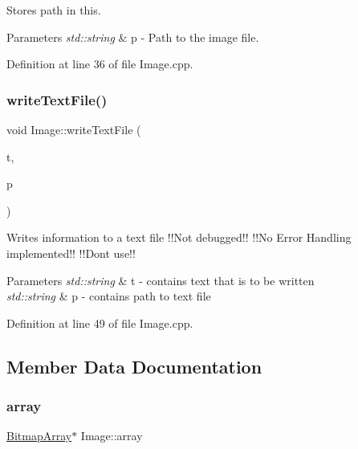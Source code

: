 Stores path in this. 


\begin{DoxyParams}{Parameters}
{\em std\+::string} & p -\/ Path to the image file. \\
\hline
\end{DoxyParams}


Definition at line 36 of file Image.\+cpp.

\mbox{\label{classImage_aa024e3ee7ec4a5e81130cc13b3570ee4}} 
\subsubsection{\texorpdfstring{writeTextFile()}{writeTextFile()}}
{\footnotesize\ttfamily void Image\+::write\+Text\+File (\begin{DoxyParamCaption}\item[{std\+::string}]{t,  }\item[{std\+::string}]{p }\end{DoxyParamCaption})}



Writes information to a text file !!\+Not debugged!! !!\+No Error Handling implemented!! !!\+Dont use!! 


\begin{DoxyParams}{Parameters}
{\em std\+::string} & t -\/ contains text that is to be written \\
\hline
{\em std\+::string} & p -\/ contains path to text file \\
\hline
\end{DoxyParams}


Definition at line 49 of file Image.\+cpp.



\subsection{Member Data Documentation}
\mbox{\label{classImage_a1c18dd7d9eda416d44e7eb408d5b3c38}} 
\subsubsection{\texorpdfstring{array}{array}}
{\footnotesize\ttfamily \mbox{\hyperlink{classBitmapArray}{Bitmap\+Array}}$\ast$ Image\+::array\hspace{0.3cm}{\ttfamily [private]}}

